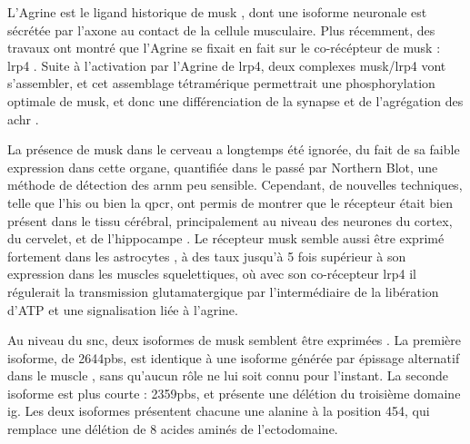 	L'Agrine est le ligand historique de \gls{musk} \cite{Glass1996}, dont une isoforme neuronale est sécrétée par l'axone au contact de la cellule musculaire. Plus récemment, des travaux ont montré que l'Agrine se fixait en fait sur le co-récépteur de \gls{musk} : \gls{lrp}4 \cite{Zhang2008,Kim2008}. Suite à l'activation par l'Agrine de \acrshort{lrp}4, deux complexes \gls{musk}/\gls{lrp}4 vont s'assembler, et cet assemblage tétramérique permettrait une phosphorylation optimale de \gls{musk}, et donc une différenciation de la synapse et de l'agrégation des \gls{achr} \cite{Zong2012}.
	
	La présence de \gls{musk} dans le cerveau a longtemps été ignorée, du fait de sa faible expression dans cette organe, quantifiée dans le passé par Northern Blot, une méthode de détection des \acrshort{arnm} peu sensible. Cependant, de nouvelles techniques, telle que l'\gls{his} ou bien la \gls{qpcr}, ont permis de montrer que le récepteur était bien présent dans le tissu cérébral, principalement au niveau des neurones du cortex, du cervelet, et de l'hippocampe \cite{Garcia-Osta2006, Ksiazek2007}. Le récepteur \gls{musk} semble aussi être exprimé fortement dans les astrocytes \cite{Sun2016}, à des taux jusqu'à 5 fois supérieur à son expression dans les muscles squelettiques, où avec son co-récepteur \gls{lrp}4 il régulerait la transmission glutamatergique par l'intermédiaire de la libération d'ATP et une signalisation liée à l'agrine.
	
	Au niveau du \gls{snc}, deux isoformes de \gls{musk} semblent être exprimées \cite{Garcia-Osta2006}. La première isoforme, de 2644pbs, est identique à une isoforme générée par épissage alternatif dans le muscle \cite{Valenzuela1995}, sans qu'aucun rôle ne lui soit connu pour l'instant. La seconde isoforme est plus courte : 2359pbs, et présente une délétion du troisième domaine \gls{ig}. Les deux isoformes présentent chacune une alanine à la position 454, qui remplace une délétion de 8 acides aminés de l'ectodomaine. 
	
